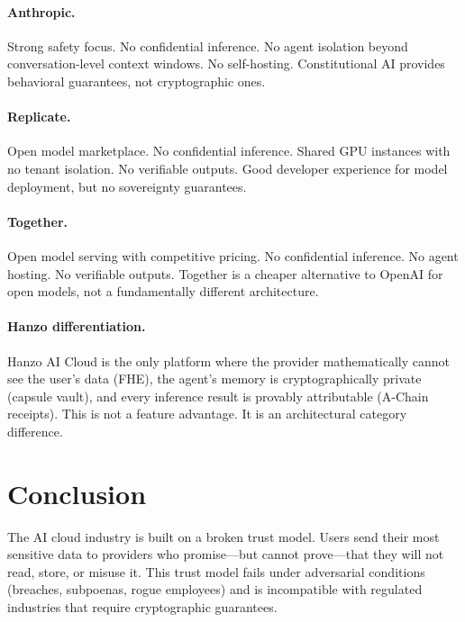 \documentclass[11pt]{article}
\begin{document}
\paragraph{Anthropic.} Strong safety focus. No confidential inference. No
agent isolation beyond conversation-level context windows. No self-hosting.
Constitutional AI provides behavioral guarantees, not cryptographic ones.

\paragraph{Replicate.} Open model marketplace. No confidential inference.
Shared GPU instances with no tenant isolation. No verifiable outputs. Good
developer experience for model deployment, but no sovereignty guarantees.

\paragraph{Together.} Open model serving with competitive pricing. No
confidential inference. No agent hosting. No verifiable outputs. Together
is a cheaper alternative to OpenAI for open models, not a fundamentally
different architecture.

\paragraph{Hanzo differentiation.} Hanzo AI Cloud is the only platform where
the provider mathematically cannot see the user's data (FHE), the agent's
memory is cryptographically private (capsule vault), and every inference result
is provably attributable (A-Chain receipts). This is not a feature advantage.
It is an architectural category difference.

\section{Conclusion}
\label{sec:conclusion}

The AI cloud industry is built on a broken trust model. Users send their most
sensitive data to providers who promise---but cannot prove---that they will not
read, store, or misuse it. This trust model fails under adversarial conditions
(breaches, subpoenas, rogue employees) and is incompatible with regulated
industries that require cryptographic guarantees.
\end{document}
